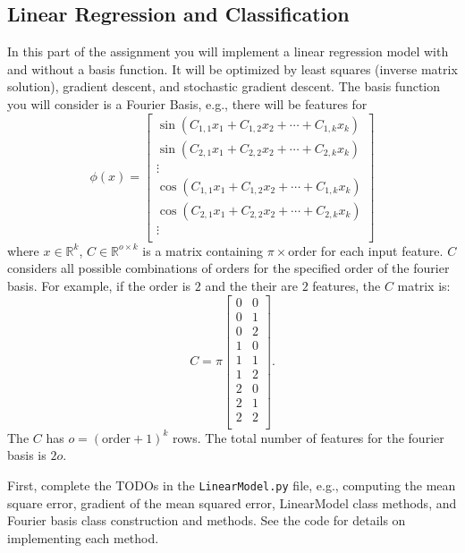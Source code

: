\documentclass{article}
\begin{document}
\subsection{Linear Regression and Classification }
    In this part of the assignment you will implement a linear regression model with and without a basis function. It will be optimized by least squares (inverse matrix solution), gradient descent, and stochastic gradient descent. The basis function you will consider is a Fourier Basis, e.g., there will be features for 
    \begin{equation}
        \phi(x) = \begin{bmatrix}
            \sin(C_{1,1}x_1 + C_{1,2}x_2 + \cdots + C_{1,k}x_k) \\
            \sin(C_{2,1}x_1 + C_{2,2}x_2 + \cdots + C_{2,k}x_k) \\
            \vdots \\
            \cos(C_{1,1}x_1 + C_{1,2}x_2 + \cdots + C_{1,k}x_k) \\
            \cos(C_{2,1}x_1 + C_{2,2}x_2 + \cdots + C_{2,k}x_k) \\
            \vdots \\
        \end{bmatrix}
    \end{equation}
where $x \in \mathbb{R}^k$, $C \in \mathbb{R}^{o \times k}$ is a matrix containing $\pi \times \textrm{order}$ for each input feature. $C$ considers all possible combinations of orders for the specified order of the fourier basis. For example, if the order is $2$ and the their are $2$ features, the $C$ matrix is:
\begin{equation}
    C = \pi\begin{bmatrix}
        0 & 0 \\
        0 & 1 \\
        0 & 2 \\
        1 & 0 \\
        1 & 1 \\
        1 & 2 \\
        2 & 0 \\
        2 & 1 \\
        2 & 2 \\
    \end{bmatrix}.
\end{equation}
The $C$ has $o = (\textrm{order}+1)^{k}$ rows. The total number of features for the fourier basis is $2o$. 

First, complete the TODOs in the \texttt{LinearModel.py} file, e.g., computing the mean square error, gradient of the mean squared error, LinearModel class methods, and Fourier basis class construction and methods. See the code for details on implementing each method. 
\end{document}
